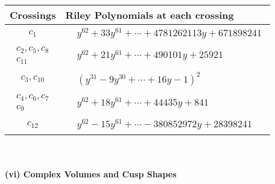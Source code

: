 \documentclass[1p]{elsarticle_modified}
\theoremstyle{definition}
\begin{document}
\begin{tabular}{m{50pt}|m{274pt}}
Crossings & \hspace{64pt}Riley Polynomials at each crossing \\
\hline $$\begin{aligned}c_{1}\end{aligned}$$&$\begin{aligned}
&y^{62}+33 y^{61}+\cdots+4781262113 y+671898241
\end{aligned}$\\
\hline $$\begin{aligned}c_{2},c_{5},c_{8}\\c_{11}\end{aligned}$$&$\begin{aligned}
&y^{62}+21 y^{61}+\cdots+490101 y+25921
\end{aligned}$\\
\hline $$\begin{aligned}c_{3},c_{10}\end{aligned}$$&$\begin{aligned}
&(y^{31}-9 y^{30}+\cdots+16 y-1)^{2}
\end{aligned}$\\
\hline $$\begin{aligned}c_{4},c_{6},c_{7}\\c_{9}\end{aligned}$$&$\begin{aligned}
&y^{62}+18 y^{61}+\cdots+44435 y+841
\end{aligned}$\\
\hline $$\begin{aligned}c_{12}\end{aligned}$$&$\begin{aligned}
&y^{62}-15 y^{61}+\cdots-380852972 y+28398241
\end{aligned}$\\
\hline
\end{tabular}\\~\\
\newpage\flushleft \textbf{(vi) Complex Volumes and Cusp Shapes}
\end{document}
